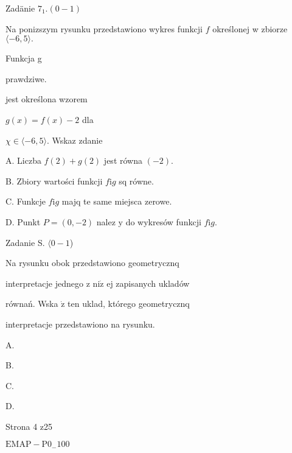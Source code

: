 \documentclass[a4paper,12pt]{article}
\begin{document}
Zadänie $7_{1}. (0-1)$

Na ponizszym rysunku przedstawiono wykres funkcji $f$ określonej w zbiorze $\langle-6, 5\rangle.$

Funkcja g

prawdziwe.

jest określona wzorem

$g(x)=f(x)-2$ dla

$\chi\in\langle-6,5\rangle$. Wskaz zdanie

A. Liczba $f(2)+g(2)$ jest równa $(-2).$

B. Zbiory wartości funkcji $f \mathrm{i} g$ sq równe.

C. Funkcje $f \mathrm{i} g$ majq te same miejsca zerowe.

D. Punkt $P=(0,-2)$ nalez $\mathrm{y}$ do wykresów funkcji $f \mathrm{i} g.$

Zadanie S. $\langle 0-1$)

Na rysunku obok przedstawiono geometrycznq

interpretacje jednego z $\mathrm{n}\mathrm{i}\dot{\mathrm{z}}$ ej zapisanych ukladów

równań. Wska $\dot{\mathrm{z}}$ ten uklad, którego geometrycznq

interpretacje przedstawiono na rysunku.

A. 

B. 

C. 

D. 

Strona 4 z25

$\mathrm{E}\mathrm{M}\mathrm{A}\mathrm{P}-\mathrm{P}0_{-}100$
\end{document}
